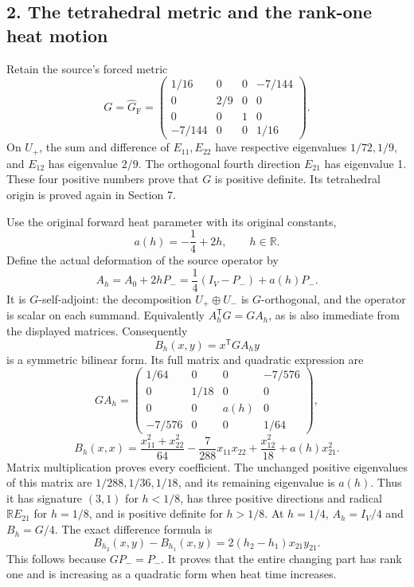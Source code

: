 \documentclass[
  10pt,
  a4paper,
]{article}
\begin{document}
\subsection{2. The tetrahedral metric and the rank-one heat
motion}\label{the-tetrahedral-metric-and-the-rank-one-heat-motion}

Retain the source's forced metric \[
G=\widehat G_{\mathrm F}=
\begin{pmatrix}
1/16&0&0&-7/144\\
0&2/9&0&0\\
0&0&1&0\\
-7/144&0&0&1/16
\end{pmatrix}.
\tag{ESQ9}
\] On \(U_+\), the sum and difference of \(E_{11},E_{22}\) have
respective eigenvalues \(1/72,1/9\), and \(E_{12}\) has eigenvalue
\(2/9\). The orthogonal fourth direction \(E_{21}\) has eigenvalue 1.
These four positive numbers prove that \(G\) is positive definite. Its
tetrahedral origin is proved again in Section 7.

Use the original forward heat parameter with its original constants, \[
a(h)=-\frac14+2h,\qquad h\in\mathbb R.
\tag{ESQ10}
\] Define the actual deformation of the source operator by \[
A_h=A_0+2hP_-
=\frac14(I_V-P_-)+a(h)P_-.
\tag{ESQ11}
\] It is \(G\)-self-adjoint: the decomposition \(U_+\oplus U_-\) is
\(G\)-orthogonal, and the operator is scalar on each summand.
Equivalently \(A_h^{\mathsf T}G=GA_h\), as is also immediate from the
displayed matrices. Consequently \[
B_h(x,y)=x^{\mathsf T}GA_hy
\tag{ESQ12}
\] is a symmetric bilinear form. Its full matrix and quadratic
expression are \[
GA_h=
\begin{pmatrix}
1/64&0&0&-7/576\\
0&1/18&0&0\\
0&0&a(h)&0\\
-7/576&0&0&1/64
\end{pmatrix},
\tag{ESQ13}
\] \[
B_h(x,x)=\frac{x_{11}^2+x_{22}^2}{64}
-\frac7{288}x_{11}x_{22}
+\frac{x_{12}^2}{18}+a(h)x_{21}^2.
\tag{ESQ14}
\] Matrix multiplication proves every coefficient. The unchanged
positive eigenvalues of this matrix are \(1/288,1/36,1/18\), and its
remaining eigenvalue is \(a(h)\). Thus it has signature \((3,1)\) for
\(h<1/8\), has three positive directions and radical \(\mathbb RE_{21}\)
for \(h=1/8\), and is positive definite for \(h>1/8\). At \(h=1/4\),
\(A_h=I_V/4\) and \(B_h=G/4\). The exact difference formula is \[
B_{h_2}(x,y)-B_{h_1}(x,y)
=2(h_2-h_1)x_{21}y_{21}.
\tag{ESQ15}
\] This follows because \(GP_-=P_-\). It proves that the entire changing
part has rank one and is increasing as a quadratic form when heat time
increases.
\end{document}

